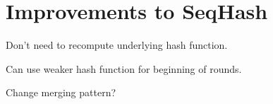\section{Improvements to SeqHash}
\label{s:improvements}


Don't need to recompute underlying hash function.

Can use weaker hash function for beginning of rounds.

Change merging pattern?
